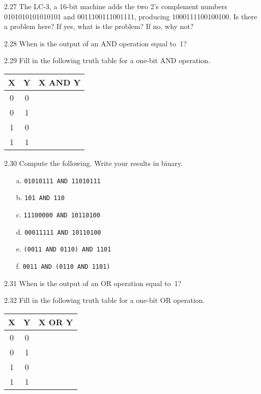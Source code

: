 \documentclass{patt}
\begin{document}
\begin{exercises}
\item[2.27] The LC-3, a 16-bit machine adds the two 2's
complement numbers 0101010101010101 and 0011100111001111,
producing 1000111100100100. Is there a problem here? If
yes, what is the problem? If no, why not?

\item[2.28] When is the output of an AND operation equal to~1?

\item[2.29] Fill in the following truth table for a one-bit AND operation.

\begin{center}
\medskip
{\fontsize{9}{13pt}\selectfont%
\begin{tabular}{cc|c}
\hline
\rule{0pt}{10pt}X\rule{0pt}{10pt} & Y & X AND Y\\
\hline
\rule{0pt}{10pt}0\rule{0pt}{10pt} & 0\\
0 & 1\\
1 & 0\\
1 & 1\\
\hline
\end{tabular}}
\bigskip
\end{center}

\item[2.30] Compute the following. Write your results in binary.
\begin{enumerate}[d.]
\item[a.] {\tt 01010111 AND 11010111}
\item[b.] {\tt 101 AND 110}
\item[c.] {\tt 11100000 AND 10110100}
\item[d.] {\tt 00011111 AND 10110100}
\item[e.] {\tt (0011 AND 0110) AND 1101}
\item[f.] {\tt 0011 AND (0110 AND 1101)}
\end{enumerate}

\item[2.31] When is the output of an OR operation equal to~1?

\item[2.32] Fill in the following truth table for a one-bit OR operation.

\begin{center}
\vspace{-6pt}
{\fontsize{9}{13pt}\selectfont%
\begin{tabular}{cc|c}
\hline
\rule{0pt}{10pt}X\rule{0pt}{10pt} & Y & X OR Y\\
\hline
\rule{0pt}{10pt}0\rule{0pt}{10pt} & 0\\
0 & 1\\
1 & 0\\
1 & 1\\
\hline
\end{tabular}}
\vspace{-6pt}
\end{center}


\end{exercises}
\end{document}
